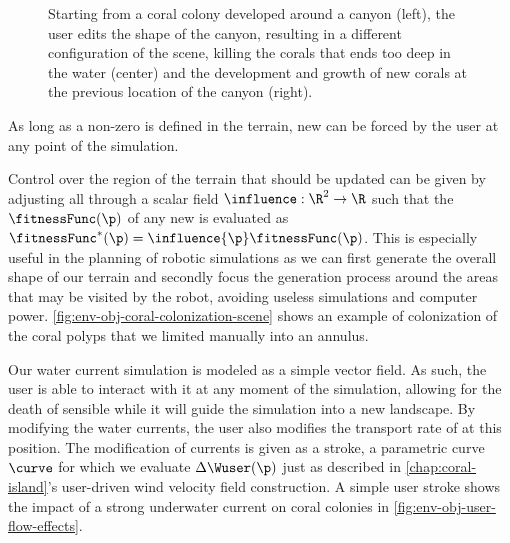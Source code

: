 \begin{figure}
    \caption{Starting from a coral colony developed around a canyon (left), the user edits the shape of the canyon, resulting in a different configuration of the scene, killing the corals that ends too deep in the water (center) and the development and growth of new corals at the previous location of the canyon (right). }
    \label{fig:env-obj-user-interaction}
\end{figure}

As long as a non-zero  is defined in the terrain, new  can be forced by the user at any point of the simulation. 

Control over the region of the terrain that should be updated can be given by adjusting all  through a scalar field $\influence: \R^2 \to \R $ such that the  $\fitnessFunc(\p)$ of any new  is evaluated as $\fitnessFunc^*(\p) = \influence{\p} \fitnessFunc(\p)$. This is especially useful in the planning of robotic simulations as we can first generate the overall shape of our terrain and secondly focus the generation process around the areas that may be visited by the robot, avoiding useless simulations and computer power. 
\cref{fig:env-obj-coral-colonization-scene} shows an example of colonization of the coral polyps that we limited manually into an annulus.



Our water current simulation is modeled as a simple vector field. As such, the user is able to interact with it at any moment of the simulation, allowing for the death of sensible  while it will guide the simulation into a new landscape. By modifying the water currents, the user also modifies the transport rate of  at this position. The modification of currents is given as a stroke, a parametric curve $\curve$ for which we evaluate $\Delta \Wuser(\p)$ just as described in \cref{chap:coral-island}'s user-driven wind velocity field construction. A simple user stroke shows the impact of a strong underwater current on coral colonies in \cref{fig:env-obj-user-flow-effects}.



